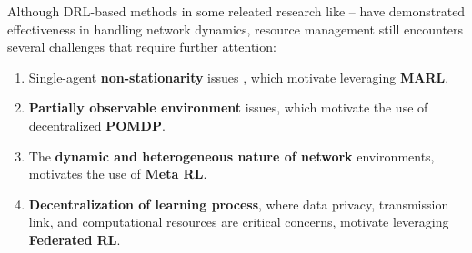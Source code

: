 \documentclass[12pt]{article}
\begin{document}
Although DRL-based methods in some releated research like \cite{munir2021multi}--\cite{sun2024hierarchical} have demonstrated effectiveness in handling network dynamics, resource management still encounters several challenges that require further attention: \vspace{0mm}
\begin{enumerate}
	\item  Single-agent \textbf{non-stationarity} issues \cite{hernandez2017survey}, which motivate leveraging \textbf{MARL}. \vspace{-1.5mm}
	
	\item \textbf{Partially observable environment} issues, which motivate the use of decentralized \textbf{POMDP}.\vspace{-1.5mm}
	
	\item The \textbf{dynamic and heterogeneous nature of network} environments, motivates the use of \textbf{Meta RL}.\vspace{-1.5mm}
	
	\item \textbf{Decentralization of learning process}, where data privacy, transmission link, and computational resources are critical concerns, motivate leveraging \textbf{Federated RL}.
\end{enumerate}
 	
% 		



\newpage
\end{document}
